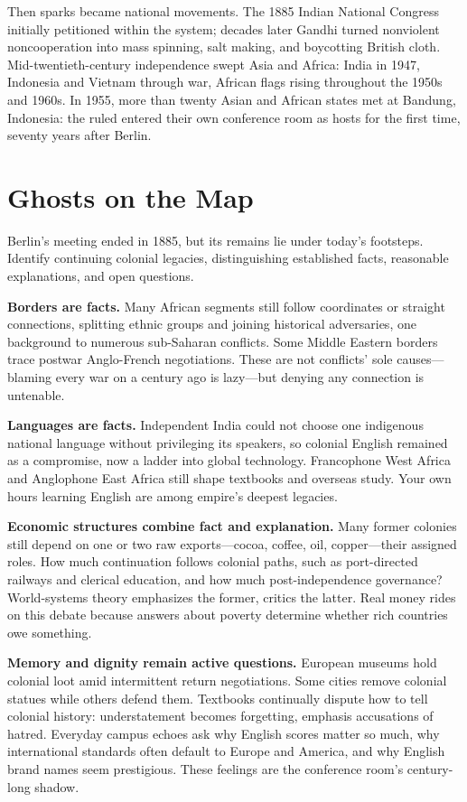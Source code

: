 Then sparks became national movements. The 1885 Indian National Congress initially petitioned within the system; decades later Gandhi turned nonviolent noncooperation into mass spinning, salt making, and boycotting British cloth. Mid-twentieth-century independence swept Asia and Africa: India in 1947, Indonesia and Vietnam through war, African flags rising throughout the 1950s and 1960s. In 1955, more than twenty Asian and African states met at Bandung, Indonesia: the ruled entered their own conference room as hosts for the first time, seventy years after Berlin.

\section{Ghosts on the Map}
Berlin's meeting ended in 1885, but its remains lie under today's footsteps. Identify continuing colonial legacies, distinguishing established facts, reasonable explanations, and open questions.

\textbf{Borders are facts.} Many African segments still follow coordinates or straight connections, splitting ethnic groups and joining historical adversaries, one background to numerous sub-Saharan conflicts. Some Middle Eastern borders trace postwar Anglo-French negotiations. These are not conflicts' sole causes---blaming every war on a century ago is lazy---but denying any connection is untenable.

\textbf{Languages are facts.} Independent India could not choose one indigenous national language without privileging its speakers, so colonial English remained as a compromise, now a ladder into global technology. Francophone West Africa and Anglophone East Africa still shape textbooks and overseas study. Your own hours learning English are among empire's deepest legacies.

\textbf{Economic structures combine fact and explanation.} Many former colonies still depend on one or two raw exports---cocoa, coffee, oil, copper---their assigned roles. How much continuation follows colonial paths, such as port-directed railways and clerical education, and how much post-independence governance? World-systems theory emphasizes the former, critics the latter. Real money rides on this debate because answers about poverty determine whether rich countries owe something.

\textbf{Memory and dignity remain active questions.} European museums hold colonial loot amid intermittent return negotiations. Some cities remove colonial statues while others defend them. Textbooks continually dispute how to tell colonial history: understatement becomes forgetting, emphasis accusations of hatred. Everyday campus echoes ask why English scores matter so much, why international standards often default to Europe and America, and why English brand names seem prestigious. These feelings are the conference room's century-long shadow.

